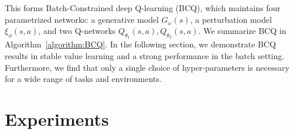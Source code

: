 \documentclass{article}
\newcommand{\y}{\gamma}
\newcommand{\ta}{\theta}
\newcommand{\w}{\omega}
\newcommand{\lb}{\left [}
\newcommand{\rb}{\right ]}
\begin{document}

This forms Batch-Constrained deep Q-learning (BCQ), which maintains four parametrized networks: a generative model $G_\w(s)$, a perturbation model $\xi_\phi(s,a)$, and two Q-networks $Q_{\ta_1}(s,a), Q_{\ta_2}(s,a)$. We summarize BCQ in Algorithm~\ref{algorithm:BCQ}. %
In the following section, we demonstrate BCQ results in stable value learning and a strong performance in the batch setting. Furthermore, we find that only a single choice of hyper-parameters is necessary for a wide range of tasks and environments.

\section{Experiments}\label{sec:exp}
\end{document}
